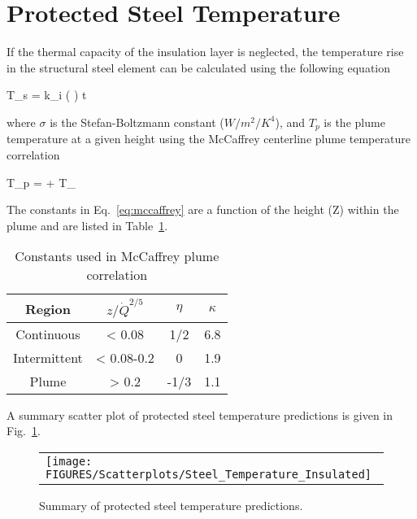 \clearpage


\section{Protected Steel Temperature}
\label{info:protected_steel_temperature}

If the thermal capacity of the insulation layer is neglected, the temperature rise in the structural steel element can be calculated using the following equation

\be
\Delta T_s = k_i \left(  \right) \Delta t
\ee

\noindent where $\sigma$ is the Stefan-Boltzmann constant ($W/m^2/K^4$), and $T_p$ is the plume temperature at a given height using the McCaffrey centerline plume temperature correlation

\be
T_p =  + T_\infty
\label{eq:mccaffrey}
\ee

The constants in Eq.~\ref{eq:mccaffrey} are a function of the height (Z) within the plume and are listed in Table~\ref{tbl:mccaffrey_constants}.

\vspace{\baselineskip}
\begin{table}[ht]
\begin{center}
\caption{Constants used in McCaffrey plume correlation}
\label{tbl:mccaffrey_constants}
\begin{tabular}{|c|c|c|c|}
\hline
Region & $z/\dot Q^{2/5}$      & $\eta$ & $\kappa$ \\
\hline
Continuous & < 0.08       & 1/2  & 6.8 \\
Intermittent & < 0.08-0.2 & 0     & 1.9 \\
Plume         & > 0.2         & -1/3 & 1.1 \\
\hline
\end{tabular}
\end{center}
\end{table}

\clearpage

A summary scatter plot of protected steel temperature predictions is given in Fig.~\ref{protected_steel_temperature_summary}.

\begin{figure}[ht]
\begin{center}
\begin{tabular}{l}
\texttt{[image: FIGURES/Scatterplots/Steel\_Temperature\_Insulated]}
\end{tabular}
\end{center}
\caption[Summary of protected steel temperature predictions.]
{Summary of protected steel temperature predictions.}
\label{protected_steel_temperature_summary}
\end{figure}

